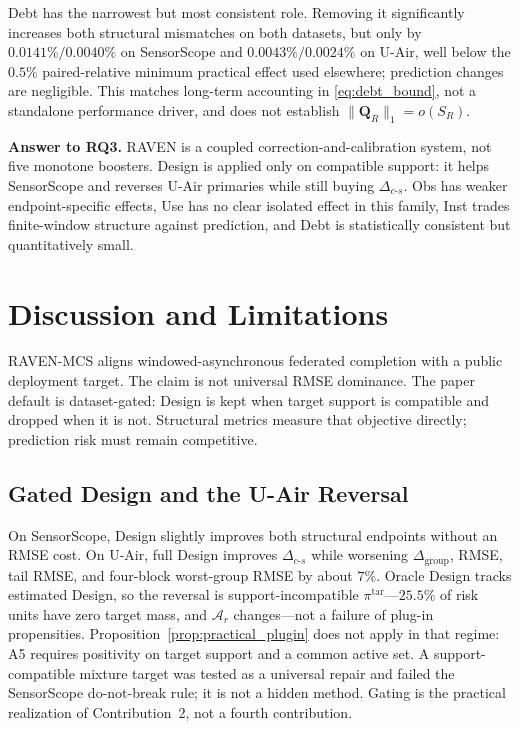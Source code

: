 \documentclass[letterpaper,journal]{IEEEtran}
\begin{document}
Debt has the narrowest but most consistent role.  Removing it significantly
increases both structural mismatches on both datasets, but only by
$0.0141\%/0.0040\%$ on SensorScope and
$0.0043\%/0.0024\%$ on U-Air, well below the $0.5\%$ paired-relative
minimum practical effect used elsewhere; prediction changes are negligible.
This matches long-term accounting in \eqref{eq:debt_bound}, not a
standalone performance driver, and does not establish
$\|\mathbf Q_R\|_1=o(S_R)$.

\noindent\textbf{Answer to RQ3.}
RAVEN is a coupled correction-and-calibration system, not five monotone
boosters.  Design is applied only on compatible support: it helps
SensorScope and reverses U-Air primaries while still buying
$\Delta_{c\text{-}s}$.  Obs has weaker endpoint-specific effects, Use
has no clear isolated effect in this family, Inst trades finite-window
structure against prediction, and Debt is statistically consistent but
quantitatively small.

\section{Discussion and Limitations}
\label{sec:discussion}

RAVEN-MCS aligns windowed-asynchronous federated completion with a public
deployment target.  The claim is not universal RMSE dominance.  The
paper default is dataset-gated: Design is kept when target support is
compatible and dropped when it is not.  Structural metrics measure that
objective directly; prediction risk must remain competitive.

\subsection{Gated Design and the U-Air Reversal}
\label{subsec:discussion_gate}

On SensorScope, Design slightly improves both structural endpoints
without an RMSE cost.  On U-Air, full Design improves
$\Delta_{c\text{-}s}$ while worsening $\Delta_{\mathrm{group}}$,
RMSE, tail RMSE, and four-block worst-group RMSE by about $7\%$.
Oracle Design tracks estimated Design, so the reversal is
support-incompatible $\pi^{\mathrm{tar}}$---$25.5\%$ of risk units
have zero target mass, and $\mathcal{A}_r$ changes---not a failure of
plug-in propensities.  Proposition~\ref{prop:practical_plugin} does
not apply in that regime: A5 requires positivity on target support and
a common active set.  A support-compatible mixture target was tested as
a universal repair and failed the SensorScope do-not-break rule; it is
not a hidden method.  Gating is the practical realization of
Contribution~2, not a fourth contribution.
\end{document}

